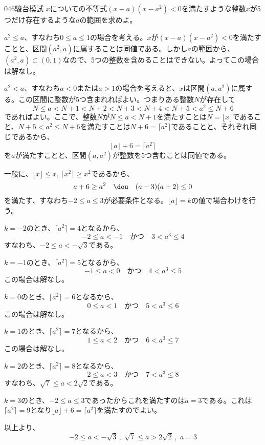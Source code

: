 \begin{thm}{046}{\maru}{駿台模試}
 $x$についての不等式$(x-a)(x-a^2)<0$を満たすような整数$x$が5つだけ存在するような$a$の範囲を求めよ。
\end{thm}

$a^2\le a$、すなわち$0\le a\le 1$の場合を考える。$x$が$(x-a)(x-a^2)<0$を満たすことと、区間$(a^2, a)$に属することは同値である。しかし$a$の範囲から、$(a^2, a)\subset (0, 1)$なので、5つの整数を含めることはできない。よってこの場合は解なし。

$a^2<a$、すなわち$a<0$または$a>1$の場合を考えると、$x$は区間$(a, a^2)$に属する。この区間に整数が5つ含まれればよい。つまりある整数$N$が存在して
\[ N\le a<N+1<N+2<N+3<N+4<N+5<a^2\le N+6 \]
であればよい。ここで、整数$N$が$N\le a<N+1$を満たすことは$N=\lfloor x\rfloor$であること、$N+5<a^2\le N+6$を満たすことは$N+6=\lceil a^2\rceil$であることと、それぞれ同じであるから、
\[ \lfloor a\rfloor + 6=\lceil a^2\rceil \]
を$a$が満たすことと、区間$(a, a^2)$が整数を5つ含むことは同値である。

一般に、$\lfloor x\rfloor \le x$, $\lceil x^2\rceil \ge x^2$であるから、
\[ a+6\ge a^2 \quad\dou\quad (a-3)(a+2)\le 0 \]
を満たす、すなわち$-2\le a\le 3$が必要条件となる。$\lfloor a\rfloor=k$の値で場合わけを行う。

$k=-2$のとき、$\lceil a^2\rceil=4$となるから、
\[ -2\le a< -1 \quad\text{かつ}\quad 3<a^3\le 4 \]
すなわち、$-2\le a <-\sqrt{3}$である。

$k=-1$のとき、$\lceil a^2\rceil=5$となるから、
\[ -1\le a< 0 \quad\text{かつ}\quad 4<a^3\le 5 \]
この場合は解なし。

$k=0$のとき、$\lceil a^2\rceil=6$となるから、
\[ 0\le a< 1 \quad\text{かつ}\quad 5<a^3\le 6 \]
この場合は解なし。

$k=1$のとき、$\lceil a^2\rceil=7$となるから、
\[ 1\le a< 2 \quad\text{かつ}\quad 6<a^3\le 7 \]
この場合は解なし。

$k=2$のとき、$\lceil a^2\rceil=8$となるから、
\[ 2\le a< 3 \quad\text{かつ}\quad 7<a^3\le 8 \]
すなわち、$\sqrt{7}\le a <2\sqrt{2}$である。

$k=3$のとき、$-2\le a\le 3$であったからこれを満たすのは$a=3$である。これは$\lceil a^2\rceil=9$となり$\lfloor a\rfloor + 6=\lceil a^2\rceil$を満たすのでよい。

以上より、
\[ -2\le a<-\sqrt{3} \,,\,\, \sqrt{7}\le a>2\sqrt{2} \,,\,\, a=3 \]

